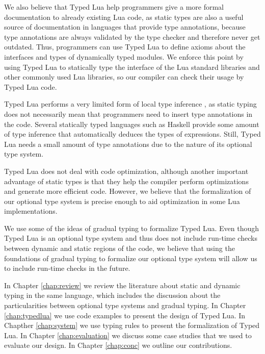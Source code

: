We also believe that Typed Lua help programmers give a more
formal documentation to already existing Lua code, as static types
are also a useful source of documentation in languages that provide
type annotations, because type annotations are always validated by
the type checker and therefore never get outdated.
Thus, programmers can use Typed Lua to define axioms about the
interfaces and types of dynamically typed modules.
We enforce this point by using Typed Lua to statically type
the interface of the Lua standard libraries and other commonly used
Lua libraries, so our compiler can check their usage by Typed Lua
code.

Typed Lua performs a very limited form of local type inference
\citep{pierce2000lti}, as static typing does not necessarily mean
that programmers need to insert type annotations in the code.
Several statically typed languages such as Haskell provide some
amount of type inference that automatically deduces the types of
expressions.
Still, Typed Lua needs a small amount of type annotations due
to the nature of its optional type system.

Typed Lua does not deal with code optimization, although another
important advantage of static types is that they help the compiler
perform optimizations and generate more efficient code.
However, we believe that the formalization of our optional type
system is precise enough to aid optimization in some Lua implementations.

We use some of the ideas of gradual typing to formalize Typed Lua.
Even though Typed Lua is an optional type system and thus does not
include run-time checks between dynamic and static regions of the
code, we believe that using the foundations of gradual typing to
formalize our optional type system will allow us to include run-time
checks in the future.

In Chapter \ref{chap:review} we review the literature about static and
dynamic typing in the same language, which includes the discussion
about the particularities between optional type systems and gradual
typing.
In Chapter \ref{chap:typedlua} we use code examples to present the
design of Typed Lua.
In Chapther \ref{chap:system} we use typing rules to present the
formalization of Typed Lua.
In Chapter \ref{chap:evaluation} we discuss some case studies that
we used to evaluate our design.
In Chapter \ref{chap:conc} we outline our contributions.

